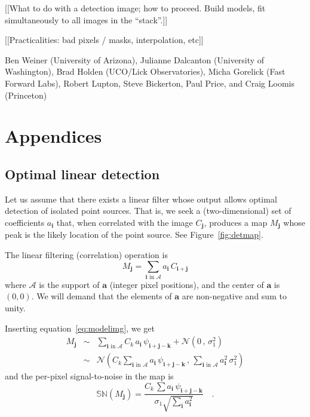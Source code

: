 \documentclass[letterpaper,preprint]{aastex62}
\newcommand{\equationname}{equation}
\newcommand{\eqnref}[1]{\mbox{\equationname~\ref{#1}}}
\newcommand{\figref}[1]{\mbox{Figure~\ref{#1}}}
\newcommand{\drawnfrom}{\sim}
\newcommand{\gaussianN}{\mathcal{N}}
\newcommand{\gaussx}[2]{\gaussianN\!\left(#1 \, , \, #2\right)}
\newcommand{\psf}{\psi}
\newcommand{\psfat}[1]{\psf_{#1}}
\newcommand{\signoise}{[S/N]}
\newcommand{\snr}[1]{\mathbb{SN}(#1)}
\renewcommand{\vec}[1]{\boldsymbol{#1}}
\newcommand{\avec}{\vec{a}}
\newcommand{\ivec}{\vec{i}}
\newcommand{\jvec}{\vec{j}}
\newcommand{\kvec}{\vec{k}}
\newcommand{\coord}[2]{(#1, #2)}
\newcommand{\iina}{\ivec \,\, \mathrm{in} \,\, \mathcal{A}}
\begin{document}
[[What to do with a detection image; how to proceed.  Build models,
    fit simultaneously to all images in the ``stack''.]]

[[Practicalities: bad pixels / masks, interpolation, etc]]

\acknowledgements

Ben Weiner (University of Arizona),
Julianne Dalcanton (University of Washington),
Brad Holden (UCO/Lick Observatories),
Micha Gorelick (Fast Forward Labs),
Robert Lupton, Steve Bickerton, Paul Price, and Craig Loomis (Princeton)


%
%



\appendix

\section{Appendices}

\subsection{Optimal linear detection}
\label{app:lindet}

Let us assume that there exists a linear filter whose output allows
optimal detection of isolated point sources.  That is, we seek a
(two-dimensional) set of coefficients $a_{\ivec}$ that, when
correlated with the image $C_{\jvec}$, produces a map $M_{\jvec}$
whose peak is the likely location of the point source.  See
\figref{fig:detmap}.


The linear filtering (correlation) operation is
\begin{equation}
M_{\jvec} = \sum_{\iina} a_{\ivec} \, C_{\ivec + \jvec}
\label{eq:detmap1}
\end{equation}
where $\mathcal{A}$ is the support of $\avec$ (integer pixel
positions), and the center of $\avec$ is $\coord{0}{0}$.  We will
demand that the elements of $\avec$ are non-negative and sum to unity.

Inserting \eqnref{eq:modelimg}, we get
\begin{eqnarray}
M_{\jvec} &\drawnfrom& \sum_{\iina}
  C_k \, a_{\ivec} \, \psfat{\ivec + \jvec - \kvec} + \gaussx{0}{\sigma_1^2}
  \\
&\drawnfrom& \gaussx{ C_k \sum_{\iina} a_{\ivec} \, \psfat{\ivec + \jvec - \kvec}}%
    {\sum_{\iina} a_{\ivec}^2 \, \sigma_1^2}
\end{eqnarray}
and the per-pixel signal-to-noise in the map is
\begin{equation}
  \snr{M_{\jvec}} = \frac{C_k \, \sum a_{\ivec} \, \psfat{\ivec + \jvec - \kvec}}{\sigma_1 \sqrt{\sum_{\ivec} a_{\ivec}^2}} \quad .
  \label{eq:detmapsn1}
\end{equation}
\end{document}
